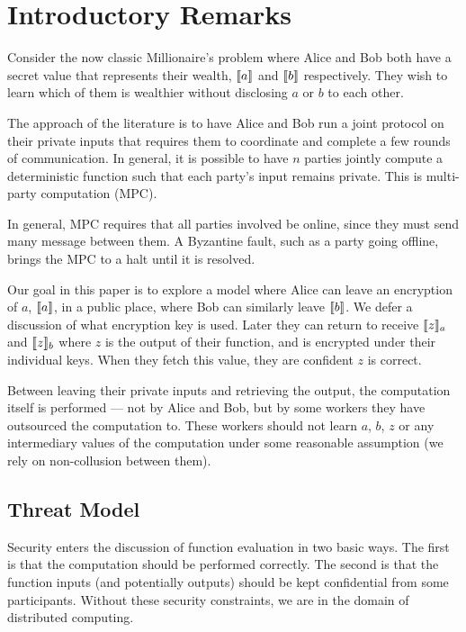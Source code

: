 \section{Introductory Remarks}

Consider the now classic Millionaire's problem where Alice and Bob both have a secret value that represents their wealth, $\llbracket a \rrbracket$ and $\llbracket b \rrbracket$ respectively. They wish to learn which of them is wealthier without disclosing $a$ or $b$ to each other.

The approach of the literature is to have Alice and Bob run a joint protocol on their private inputs that requires them to coordinate and complete a few rounds of communication. In general, it is possible to have $n$ parties jointly compute a deterministic function such that each party's input remains private. This is multi-party computation (MPC).

In general, MPC requires that all parties involved be online, since they must send many message between them. A Byzantine fault, such as a party going offline, brings the MPC to a halt until it is resolved.

Our goal in this paper is to explore a model where Alice can leave an encryption of $a$, $\llbracket a \rrbracket$, in a public place, where Bob can similarly leave $\llbracket b \rrbracket$. We defer a discussion of what encryption key is used. Later they can return to receive $\llbracket z \rrbracket_a$ and $\llbracket z \rrbracket_b$ where $z$ is the output of their function, and is encrypted under their individual keys. When they fetch this value, they are confident $z$ is correct.

Between leaving their private inputs and retrieving the output, the computation itself is performed --- not by Alice and Bob, but by some workers they have outsourced the computation to. These workers should not learn $a$, $b$, $z$ or any intermediary values of the computation under some reasonable assumption (we rely on non-collusion between them).


\subsection{Threat Model}

Security enters the discussion of function evaluation in two basic ways. The first is that the computation should be performed correctly. The second is that the function inputs (and potentially outputs) should be kept confidential from some participants. Without these security constraints, we are in the domain of distributed computing.

